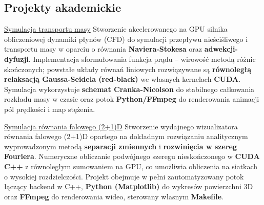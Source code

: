 \documentclass[final,a4paper,10pt,onecolumn]{article}
\begin{document}
\begin{cvmain}
\section{Projekty akademickie}

\projentry
    {\href{https://github.com/mflagga/cuda-cfd-solver}{Symulacja transportu masy}}
    {
        Stworzenie akcelerowanego na GPU silnika obliczeniowej dynamiki płynów (CFD) do symulacji przepływu nieściśliwego i transportu masy w oparciu o równania \textbf{Naviera-Stokesa} oraz \textbf{adwekcji-dyfuzji}.
        Implementacja sformułowania funkcja prądu -- wirowość metodą różnic skończonych; powstałe układy równań liniowych rozwiązywane są \textbf{równoległą relaksacją Gaussa-Seidela (red-black)} we własnych kernelach \textbf{CUDA}.
        Symulacja wykorzystuje \textbf{schemat Cranka-Nicolson} do stabilnego całkowania rozkładu masy w czasie oraz potok \textbf{Python/FFmpeg} do renderowania animacji pól prędkości i map stężenia.
    }

\projentry
    {\href{https://github.com/mflagga/wave-vis}{Symulacja równania falowego (2+1)D}}
    {
        Stworzenie wydajnego wizualizatora równania falowego (2+1)D opartego na dokładnym rozwiązaniu analitycznym wyprowadzonym metodą \textbf{separacji zmiennych} i \textbf{rozwinięcia w szereg Fouriera}.
        Numeryczne obliczanie podwójnego szeregu nieskończonego w \textbf{CUDA C++} z równoległym sumowaniem na GPU, co umożliwia obliczenia na siatkach o wysokiej rozdzielczości.
        Projekt obejmuje w pełni zautomatyzowany potok łączący backend w C++, \textbf{Python (Matplotlib)} do wykresów powierzchni 3D oraz \textbf{FFmpeg} do renderowania wideo, sterowany własnym \textbf{Makefile}.
    }

\end{cvmain}
\end{document}
